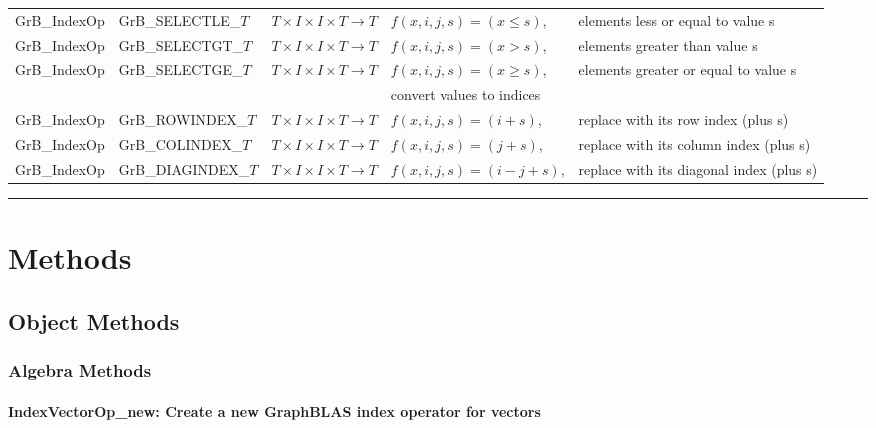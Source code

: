 \begin{table}[h]
\begin{threeparttable}
\begin{tabular}{l|l|l|ll}
{\sf GrB\_IndexOp}   & {\sf GrB\_SELECTLE\_$T$}   & $T \times I \times I \times T \rightarrow T$ & $f(x,i,j,s) = (x \leq s)$, & elements less or equal to value s \\
{\sf GrB\_IndexOp}   & {\sf GrB\_SELECTGT\_$T$}   & $T \times I \times I \times T \rightarrow T$ & $f(x,i,j,s) = (x > s)$, & elements greater than value s \\
{\sf GrB\_IndexOp}   & {\sf GrB\_SELECTGE\_$T$}   & $T \times I \times I \times T \rightarrow T$ & $f(x,i,j,s) = (x \geq s)$, & elements greater or equal to value s \\
& & & convert values to indices \\
{\sf GrB\_IndexOp}   & {\sf GrB\_ROWINDEX\_$T$}   & $T \times I \times I \times T \rightarrow T$ & $f(x,i,j,s) = (i + s)$, & replace with its row index (plus s) \\
{\sf GrB\_IndexOp}   & {\sf GrB\_COLINDEX\_$T$}   & $T \times I \times I \times T \rightarrow T$ & $f(x,i,j,s) = (j + s)$, & replace with its column index (plus s) \\
{\sf GrB\_IndexOp}   & {\sf GrB\_DIAGINDEX\_$T$}  & $T \times I \times I \times T \rightarrow T$ & $f(x,i,j,s) = (i - j + s)$, & replace with its diagonal index (plus s) \\
\end{tabular}
\hrule
\end{threeparttable}
\end{table}



\chapter{Methods}
\section{Object Methods}
\subsection{Algebra Methods}

\subsubsection{{\sf IndexVectorOp\_new}: Create a new GraphBLAS index operator for vectors}

